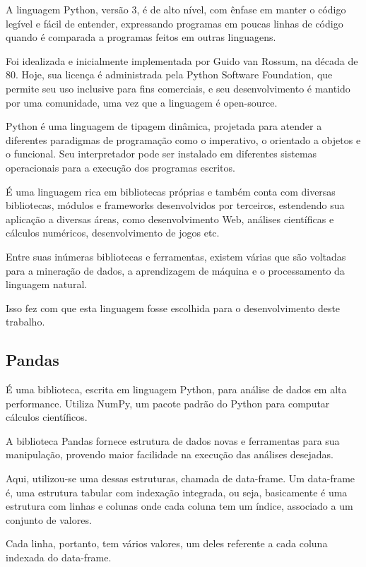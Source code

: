 \documentclass[tcc, capa]{texucpel}
\begin{document}
A linguagem Python, versão 3, é de alto nível, com ênfase em manter o código legível e fácil de entender,  expressando programas em poucas linhas de código quando é comparada a programas feitos em outras linguagens.

Foi idealizada e inicialmente implementada por Guido van Rossum, na década de 80. Hoje, sua licença é administrada pela Python Software Foundation,\cite{pythonfundation} que permite seu uso inclusive para fins comerciais, e seu desenvolvimento é mantido por uma comunidade, uma vez que a linguagem é open-source.

Python é uma linguagem de tipagem dinâmica, projetada para atender a diferentes paradigmas de programação como o imperativo, o orientado a objetos e o funcional. Seu interpretador pode ser instalado em diferentes sistemas operacionais para a execução dos programas escritos.

É uma linguagem rica em bibliotecas próprias e também conta com diversas bibliotecas, módulos e frameworks desenvolvidos por terceiros, estendendo sua aplicação a diversas áreas, como desenvolvimento Web, análises científicas e cálculos numéricos, desenvolvimento de jogos etc.

Entre suas inúmeras bibliotecas e ferramentas, existem várias que são voltadas para a mineração de dados, a aprendizagem de máquina e o processamento da linguagem natural.

Isso fez com que esta linguagem fosse escolhida para o desenvolvimento deste trabalho.

\subsection{Pandas}
É uma biblioteca, escrita em linguagem Python, para análise de dados em alta performance. Utiliza NumPy, um pacote padrão do Python para computar cálculos científicos.

A biblioteca Pandas fornece estrutura de dados novas e ferramentas para sua manipulação, provendo maior facilidade na execução das análises desejadas.

Aqui, utilizou-se uma dessas estruturas, chamada de data-frame. Um data-frame é, uma estrutura tabular com indexação integrada, ou seja, basicamente é uma estrutura com linhas e colunas onde cada coluna tem um índice, associado a um conjunto de valores. 

Cada linha, portanto, tem vários valores, um deles referente a cada coluna indexada do data-frame.
\end{document}
